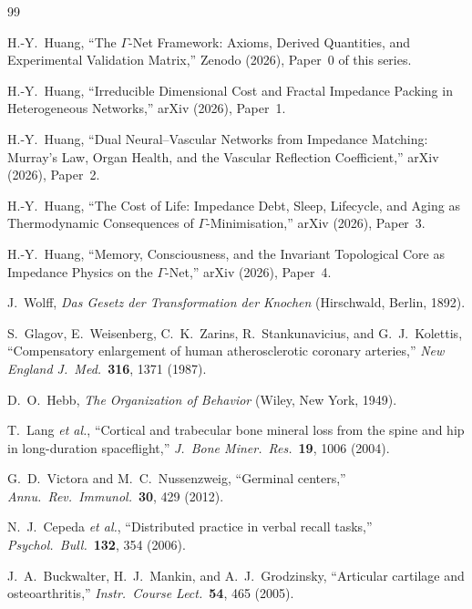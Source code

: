 \documentclass[aps,pre,twocolumn,superscriptaddress,floatfix]{revtex4-2}
\begin{document}
\begin{thebibliography}{99}

H.-Y.~Huang, ``The $\Gamma$-Net Framework: Axioms, Derived
Quantities, and Experimental Validation Matrix,''
Zenodo (2026), Paper~0 of this series.

H.-Y.~Huang, ``Irreducible Dimensional Cost and Fractal
Impedance Packing in Heterogeneous Networks,''
arXiv (2026), Paper~1.

H.-Y.~Huang, ``Dual Neural--Vascular Networks from Impedance
Matching: Murray's Law, Organ Health, and the Vascular
Reflection Coefficient,'' arXiv (2026), Paper~2.

H.-Y.~Huang, ``The Cost of Life: Impedance Debt, Sleep,
Lifecycle, and Aging as Thermodynamic Consequences of
$\Gamma$-Minimisation,'' arXiv (2026), Paper~3.

H.-Y.~Huang, ``Memory, Consciousness, and the Invariant
Topological Core as Impedance
Physics on the $\Gamma$-Net,'' arXiv (2026), Paper~4.

J.~Wolff, \emph{Das Gesetz der Transformation der Knochen}
(Hirschwald, Berlin, 1892).

S.~Glagov, E.~Weisenberg, C.~K.~Zarins, R.~Stankunavicius,
and G.~J.~Kolettis, ``Compensatory enlargement of human
atherosclerotic coronary arteries,''
\emph{New England J.\ Med.}\ \textbf{316}, 1371 (1987).

D.~O.~Hebb, \emph{The Organization of Behavior}
(Wiley, New York, 1949).

T.~Lang \emph{et al.}, ``Cortical and trabecular bone
mineral loss from the spine and hip in long-duration
spaceflight,'' \emph{J.\ Bone Miner.\ Res.}\ \textbf{19},
1006 (2004).

G.~D.~Victora and M.~C.~Nussenzweig, ``Germinal centers,''
\emph{Annu.\ Rev.\ Immunol.}\ \textbf{30}, 429 (2012).

N.~J.~Cepeda \emph{et al.}, ``Distributed practice in
verbal recall tasks,'' \emph{Psychol.\ Bull.}\ \textbf{132},
354 (2006).

J.~A.~Buckwalter, H.~J.~Mankin, and A.~J.~Grodzinsky,
``Articular cartilage and osteoarthritis,''
\emph{Instr.\ Course Lect.}\ \textbf{54}, 465 (2005).


\end{thebibliography}
\end{document}
